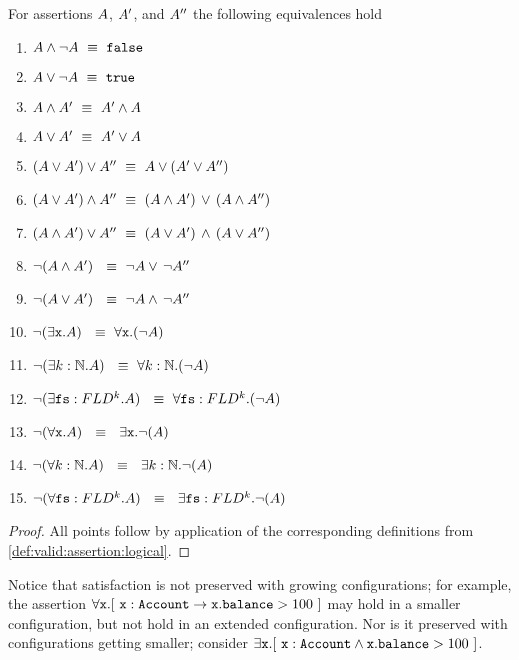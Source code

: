\begin{lemma}
For     assertions $A$, $A'$, and $A''$ the following equivalences hold
\label{lemma:basic_assertions_classical}
\begin{enumerate}
\item
$ A \wedge\neg A \ \equiv \  {\mbox{\tt{false}}}$
\item
$ A \vee \neg A   \ \equiv \  {\mbox{\tt{true}}}$
\item
$ A \wedge A'  \ \equiv \  A' \wedge A$
\item
$ A \vee A'  \ \equiv \  A' \vee A$
\item
$(A \vee A') \vee A'' \ \equiv \  A \vee (A' \vee A'')$
\item
$(A \vee A') \wedge A'' \ \equiv \  (A \wedge A')\, \vee\, (A \wedge A'')$
\item
$(A \wedge A') \vee A'' \ \equiv \  (A \vee A')\, \wedge\, (A \vee A'')$
\item
$\neg (A \wedge A') \  \ \equiv \  \neg  A   \vee\, \neg A''$
\item
$\neg (A \vee A') \  \ \equiv \  \neg  A   \wedge\, \neg A''$
\item
$\neg (\exists \prg{x}.\A )  \  \ \equiv \  \forall \prg{x}.(\neg  \A)$
\item
$\neg (\exists k:\mathbb{N}.\A )  \  \ \equiv \  \forall  k:\mathbb{N}.(\neg  \A)$
\item
$\neg (\exists {\mbox{\tt{fs}}}:FLD^k.A )  \  \ \equiv \  \forall {\mbox{\tt{fs}}}:FLD^k.(\neg  A)$
\item
$\neg (\forall \prg{x}. \A)  \  \ \equiv \  \  \exists \prg{x}.\neg(\A )$
\item
$\neg (\forall k:\mathbb{N}. \A)  \  \ \equiv \  \  \exists k:\mathbb{N}.\neg(\A )$
\item
$\neg (\forall {\mbox{\tt{fs}}}:FLD^k. A)  \  \ \equiv \  \  \exists {\mbox{\tt{fs}}}:FLD^k.\neg(A )$
\end{enumerate}
\end{lemma}
\begin{proof}
All points follow by application of the corresponding definitions from \ref{def:valid:assertion:logical}.
 \end{proof}

 Notice that satisfaction is not preserved with growing configurations; for example, the assertion $\forall {\mbox{\tt{x}}}. [\ {\mbox{\tt{x}}} : {\mbox{\tt{Account}}} \rightarrow {\mbox{\tt{x}}}.{\mbox{\tt{balance}}}>100\ ]$ 
may hold in a smaller configuration, but not hold in an extended configuration. 
Nor is it preserved with configurations getting smaller; consider \eg $\exists {\mbox{\tt{x}}}. [\ {\mbox{\tt{x}}} : {\mbox{\tt{Account}}} \wedge {\mbox{\tt{x}}}.{\mbox{\tt{balance}}}>100\ ]$.


